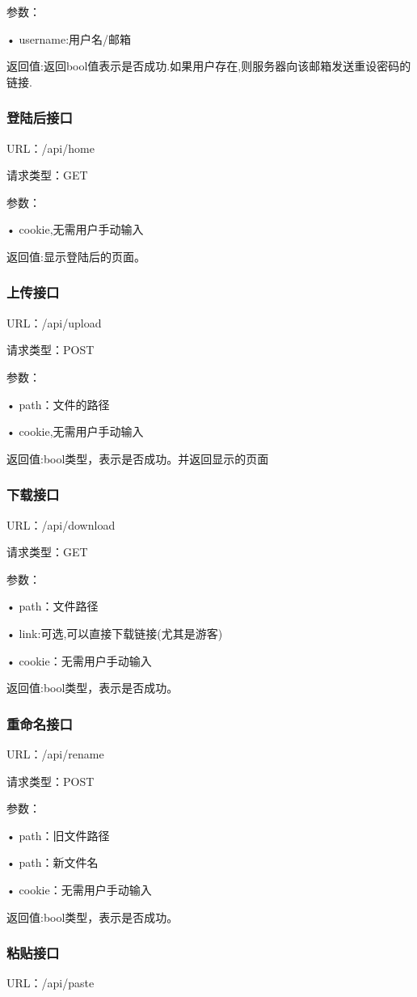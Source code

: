 参数：

• username:用户名/邮箱

返回值:返回bool值表示是否成功.如果用户存在,则服务器向该邮箱发送重设密码的链接.

\subsubsection{登陆后接口}
URL：/api/home

请求类型：GET

参数：

• cookie,无需用户手动输入

返回值:显示登陆后的页面。

\subsubsection{上传接口}
URL：/api/upload

请求类型：POST

参数：

• path：文件的路径

• cookie,无需用户手动输入

返回值:bool类型，表示是否成功。并返回显示的页面

\subsubsection{下载接口}
URL：/api/download

请求类型：GET

参数：

• path：文件路径

• link:可选,可以直接下载链接(尤其是游客)

• cookie：无需用户手动输入

返回值:bool类型，表示是否成功。

\subsubsection{重命名接口}
URL：/api/rename

请求类型：POST
 
参数：

• path：旧文件路径

• path：新文件名

• cookie：无需用户手动输入

返回值:bool类型，表示是否成功。

\subsubsection{粘贴接口}
URL：/api/paste

